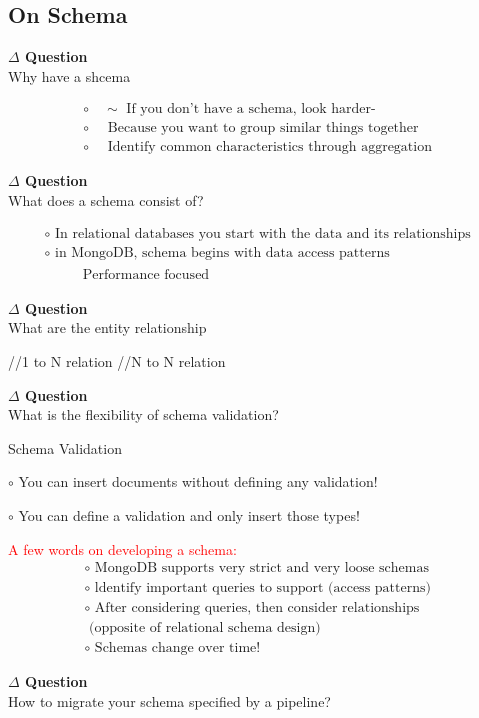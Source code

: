 \documentclass[12pt]{article}
\newenvironment{que}
    { \begin{mdframed}[backgroundcolor=green!20] \textbf{$\Delta$ Question} \\}
    {  \end{mdframed}}
\begin{document}
\begin{code}
\subsection{On Schema}
\begin{que}
Why have a shcema
\end{que}
$$
\begin{array}{l}{\circ \quad \sim \text { If you don't have a schema, look harder- }} \\ {\circ \quad \text { Because you want to group similar things together }} \\ {\circ \quad \text { Identify common characteristics through aggregation }}\end{array}
$$
\begin{que}
What does a schema consist of?
\end{que}
$$
\begin{array}{l}{\circ \text { In relational databases you start with the data and its relationships }} \\ {\circ \text { in MongoDB, schema begins with data access patterns }} \\ {\qquad \begin{array}{ll}{\text { Performance focused }}\end{array}}\end{array}
$$
\begin{que}
What are the entity relationship
\end{que}
\begin{code}
//1 to N relation
//N to N relation
\end{code}

\begin{que}
What is the flexibility of schema validation?
\end{que}
Schema Validation

$\circ$ You can insert documents without defining any validation!

$\circ$ You can define a validation and only insert those types!

\noindent
\textcolor{red}{A few words on developing a schema:}
$$
\begin{array}{l}{\circ \text { MongoDB supports very strict and very loose schemas }} \\ {\circ \text { ldentify important queries to support (access patterns) }} \\ {\circ \text { After considering queries, then consider relationships }} \\ {\text { (opposite of relational schema design) }} \\ {\circ \text { Schemas change over time! }}\end{array}
$$
\begin{que}
How to migrate your schema specified by a pipeline?
\end{que}


\end{code}
\end{document}
